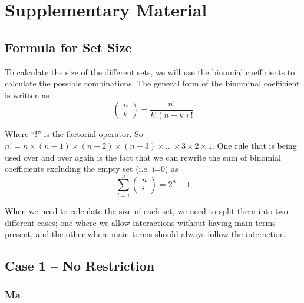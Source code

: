 \section{Supplementary Material} 

\setcounter{table}{0}
\setcounter{figure}{0}
\renewcommand{\thetable}{SI\arabic{table}}
\renewcommand{\thefigure}{SI\arabic{figure}}

\subsection{Formula for Set Size}
To calculate the size of the different sets, we will use the binomial coefficients to calculate the possible combinations. The general form of the binominal coefficient is written as
\[\left( \begin{array}{c}
n \\ 
k \end{array}
\right)=\frac{n!}{k!\left(n-k\right)!}\] 

Where ``!'' is the factorial operator. So $n!=n\times \left(n-1\right)\times \left(n-2\right)\times \left(n-3\right)\times \dots \times 3\times 2\times 1$. One rule that is being used over and over again is the fact that we can rewrite the sum of binomial coefficients excluding the empty set (i.e. i=0) as 
\[\sum^n_{i=1}{\left( \begin{array}{c}
n \\ 
i \end{array}
\right)}=2^n-1\] 

When we need to calculate the size of each set, we need to split them into two different cases; one where we allow interactions without having main terms present, and the other where main terms should always follow the interaction. \\

\subsection{Case 1 – No Restriction}
\subsubsection{Ma} \hfill 

